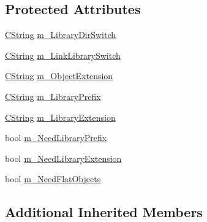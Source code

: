 \subsection*{Protected Attributes}
\begin{DoxyCompactItemize}
\item 
\hyperlink{classCString}{C\-String} \hyperlink{classCLinker_a8221d44b37262b0c8c6bfbf7d0f1680e}{m\-\_\-\-Library\-Dir\-Switch}
\item 
\hyperlink{classCString}{C\-String} \hyperlink{classCLinker_a2417ec61775026fc3efcfb46118c5a93}{m\-\_\-\-Link\-Library\-Switch}
\item 
\hyperlink{classCString}{C\-String} \hyperlink{classCLinker_ae5945cfa69ae9ffd27fb7a41f618cbb8}{m\-\_\-\-Object\-Extension}
\item 
\hyperlink{classCString}{C\-String} \hyperlink{classCLinker_a701e77df0c24ca36679b98328ba509e6}{m\-\_\-\-Library\-Prefix}
\item 
\hyperlink{classCString}{C\-String} \hyperlink{classCLinker_af481e3e79703844fe6b7b9bc0a44d8b2}{m\-\_\-\-Library\-Extension}
\item 
bool \hyperlink{classCLinker_a2d18d1f275583edaf51929171e91189c}{m\-\_\-\-Need\-Library\-Prefix}
\item 
bool \hyperlink{classCLinker_ac699e22d086ddbb74d39a381a55f0cfb}{m\-\_\-\-Need\-Library\-Extension}
\item 
bool \hyperlink{classCLinker_abf55c8a0d374129e983314f6ea492455}{m\-\_\-\-Need\-Flat\-Objects}
\end{DoxyCompactItemize}
\subsection*{Additional Inherited Members}


